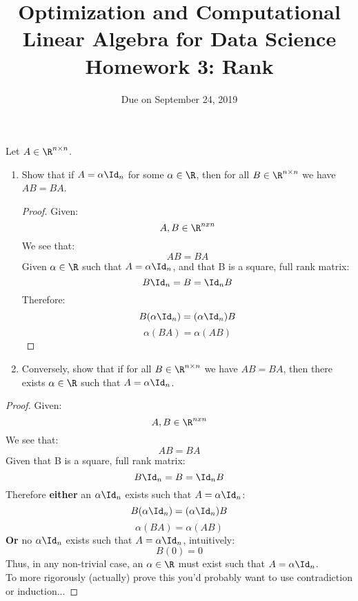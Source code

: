 \documentclass[11pt,nocut]{article}
\title{\vspace{-2.0cm}%
	Optimization and Computational Linear Algebra for Data Science\\
Homework 3: Rank}
\date{\vspace{-1cm}Due on September 24, 2019}
\begin{document}
\maketitle



\begin{problem}[2 points]
	Let $A \in \R^{n \times n}$.
	\begin{enumerate}[label=\normalfont(\textbf{\alph*})]
		\item Show that if $A = \alpha \Id_n$ for some $\alpha \in \R$, then for all $B \in \R^{n \times n}$ we have $A B = B A$.
		
		\begin{proof}
		Given: 
		$$
		A , B \in \R^{nxn}
		$$
		We see that:
		$$
		AB = BA
		$$
		Given $\alpha \in \R$ such that $A = \alpha \Id_n$, and that B is a square, full rank matrix:
		$$
		B \Id_n = B = \Id_n B
		$$
		Therefore:
		$$
		B (\alpha \Id_n) = (\alpha \Id_n) B
		$$
		$$
		\alpha (BA) = \alpha (AB)
		$$
		\end{proof}
		
		\item Conversely, show that if for all $B \in \R^{n \times n}$ we have $AB = BA$, then there exists $\alpha \in \R$ such that $A = \alpha \Id_n$.
	\end{enumerate}
	
		\begin{proof}
		Given: 
		$$
		A , B \in \R^{nxn}
		$$
		We see that:
		$$
		AB = BA
		$$
		Given that B is a square, full rank matrix:
		$$
		B \Id_n = B = \Id_n B
		$$
		Therefore \textbf{either} an $\alpha \Id_n$ exists such that $A = \alpha \Id_n$:
		$$
		B (\alpha \Id_n) = (\alpha \Id_n) B
		$$
		$$
		\alpha (BA) = \alpha (AB)
		$$
		\textbf{Or} no $\alpha \Id_n$ exists such that $A = \alpha \Id_n$, intuitively:
		$$
		B (0) = 0
		$$
		Thus, in any non-trivial case, an $\alpha \in \R$ must exist such that $A = \alpha \Id_n$. \\
		To more rigorously (actually) prove this you'd probably want to use contradiction or induction...
		\end{proof}
		
\end{problem}

\vspace{1mm}
\end{document}
